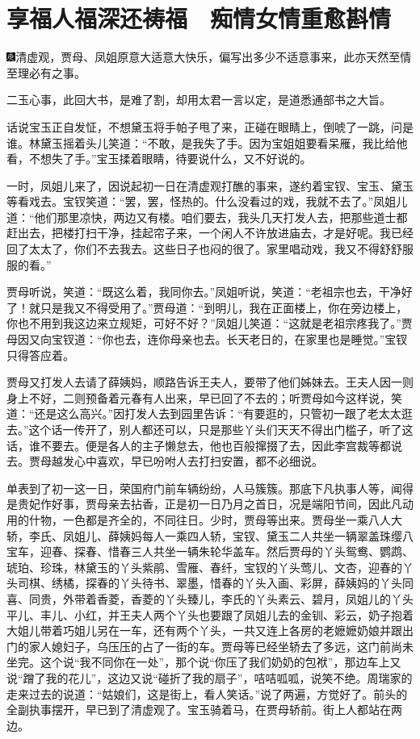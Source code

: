 

\chapter{享福人福深还祷福　痴情女情重愈斟情}

{\includegraphics[width=3mm]{../Images/00004}清虚观，贾母、凤姐原意大适意大快乐，偏写出多少不适意事来，此亦天然至情至理必有之事。}

{二玉心事，此回大书，是难了割，却用太君一言以定，是道悉通部书之大旨。}

话说宝玉正自发怔，不想黛玉将手帕子甩了来，正碰在眼睛上，倒唬了一跳，问是谁。林黛玉摇着头儿笑道：``不敢，是我失了手。因为宝姐姐要看呆雁，我比给他看，不想失了手。''宝玉揉着眼睛，待要说什么，又不好说的。

一时，凤姐儿来了，因说起初一日在清虚观打醮的事来，遂约着宝钗、宝玉、黛玉等看戏去。宝钗笑道：``罢，罢，怪热的。什么没看过的戏，我就不去了。''凤姐儿道：``他们那里凉快，两边又有楼。咱们要去，我头几天打发人去，把那些道士都赶出去，把楼打扫干净，挂起帘子来，一个闲人不许放进庙去，才是好呢。我已经回了太太了，你们不去我去。这些日子也闷的很了。家里唱动戏，我又不得舒舒服服的看。''

贾母听说，笑道：``既这么着，我同你去。''凤姐听说，笑道：``老祖宗也去，干净好了！就只是我又不得受用了。''贾母道：``到明儿，我在正面楼上，你在旁边楼上，你也不用到我这边来立规矩，可好不好？''凤姐儿笑道：``这就是老祖宗疼我了。''贾母因又向宝钗道：``你也去，连你母亲也去。长天老日的，在家里也是睡觉。''宝钗只得答应着。

贾母又打发人去请了薛姨妈，顺路告诉王夫人，要带了他们姊妹去。王夫人因一则身上不好，二则预备着元春有人出来，早已回了不去的；听贾母如今这样说，笑道：``还是这么高兴。''因打发人去到园里告诉：``有要逛的，只管初一跟了老太太逛去。''这个话一传开了，别人都还可以，只是那些丫头们天天不得出门槛子，听了这话，谁不要去。便是各人的主子懒怠去，他也百般撺掇了去，因此李宫裁等都说去。贾母越发心中喜欢，早已吩咐人去打扫安置，都不必细说。

单表到了初一这一日，荣国府门前车辆纷纷，人马簇簇。那底下凡执事人等，闻得是贵妃作好事，贾母亲去拈香，正是初一日乃月之首日，况是端阳节间，因此凡动用的什物，一色都是齐全的，不同往日。少时，贾母等出来。贾母坐一乘八人大轿，李氏、凤姐儿、薛姨妈每人一乘四人轿，宝钗、黛玉二人共坐一辆翠盖珠缨八宝车，迎春、探春、惜春三人共坐一辆朱轮华盖车。然后贾母的丫头鸳鸯、鹦鹉、琥珀、珍珠，林黛玉的丫头紫鹃、雪雁、春纤，宝钗的丫头莺儿、文杏，迎春的丫头司棋、绣橘，探春的丫头待书、翠墨，惜春的丫头入画、彩屏，薛姨妈的丫头同喜、同贵，外带着香菱，香菱的丫头臻儿，李氏的丫头素云、碧月，凤姐儿的丫头平儿、丰儿、小红，并王夫人两个丫头也要跟了凤姐儿去的金钏、彩云，奶子抱着大姐儿带着巧姐儿另在一车，还有两个丫头，一共又连上各房的老嬷嬷奶娘并跟出门的家人媳妇子，乌压压的占了一街的车。贾母等已经坐轿去了多远，这门前尚未坐完。这个说``我不同你在一处''，那个说``你压了我们奶奶的包袱''，那边车上又说``蹭了我的花儿''，这边又说``碰折了我的扇子''，咭咭呱呱，说笑不绝。周瑞家的走来过去的说道：``姑娘们，这是街上，看人笑话。''说了两遍，方觉好了。前头的全副执事摆开，早已到了清虚观了。宝玉骑着马，在贾母轿前。街上人都站在两边。


